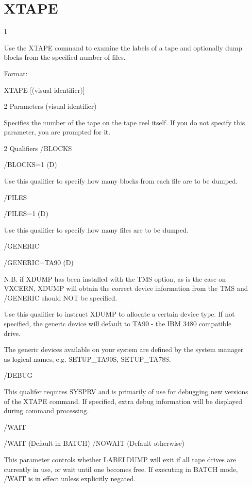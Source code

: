 \section{XTAPE}
\begin{XMP}
1 

  Use the XTAPE command to examine the labels of a tape and optionally
  dump blocks from the specified number of files.


   Format:

   XTAPE [(visual identifier)]

2 Parameters
  (visual identifier)

  Specifies the number of the tape on the tape reel itself.
  If you do not specify this parameter, you are prompted for it.

2 Qualifiers
/BLOCKS

   /BLOCKS=1 (D)

  Use this qualifier to specify how many blocks from each file are to be
  dumped.

/FILES

   /FILES=1 (D)

 Use this qualifier to specify how many files are to be dumped.

/GENERIC

   /GENERIC=TA90 (D)

 N.B. if XDUMP has been installed with the TMS option,
 as is the case on VXCERN, XDUMP will obtain the correct
 device information from the TMS and /GENERIC should NOT be specified.

 Use this qualifier to instruct XDUMP to allocate a certain
 device type. If not specified, the generic device will default to
 TA90 - the IBM 3480 compatible drive.

 The generic devices available on your system are defined by the system
 manager as logical names, e.g. SETUP_TA90S, SETUP_TA78S.

/DEBUG

 This qualifer requires SYSPRV and is primarily of use for debugging
 new versions of the XTAPE command. If specified, extra debug information
 will be displayed during command processing.

/WAIT

   /WAIT     (Default in BATCH)
   /NOWAIT   (Default otherwise)

  This parameter controls whether LABELDUMP will exit if all tape drives
  are currently in use, or wait until one becomes free. If executing
  in BATCH mode, /WAIT is in effect unless explicitly negated.

\end{XMP}
